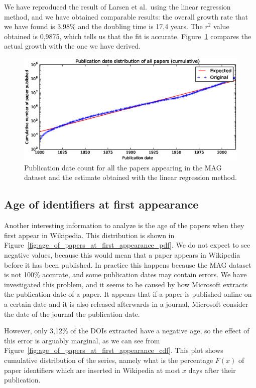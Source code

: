 We have reproduced the result of Larsen et al.\ using the linear regression method, and we have obtained comparable results: the overall growth rate that we have found is 3,98\% and the doubling time is 17,4 years.
The $r^2$ value obtained is 0,9875, which tells us that the fit is accurate.
Figure~\ref{fig:publication_date_regression} compares the actual growth with the one we have derived.

\begin{figure}[h]
\centering
\includegraphics[keepaspectratio=true, width=\textwidth]{assets/publication_date_regression}
\caption{Publication date count for all the papers appearing in the \ac{MAG} dataset and the estimate obtained with the linear regression method.}
\label{fig:publication_date_regression}
\end{figure}

\subsection{Age of identifiers at first appearance}
Another interesting information to analyze is the age of the papers when they first appear in Wikipedia.
This distribution is shown in Figure~\ref{fig:age_of_papers_at_first_appearance_pdf}.
We do not expect to see negative values, because this would mean that a paper appears in Wikipedia before it has been published.
In practice this happens because the \ac{MAG} dataset is not 100\% accurate, and some publication dates may contain errors.
We have investigated this problem, and it seems to be caused by how Microsoft extracts the publication date of a paper.
It appears that if a paper is published online on a certain date and it is also released afterwards in a journal, Microsoft consider the date of the journal the publication date.

However, only 3,12\% of the \acp{DOI} extracted have a negative age, so the effect of this error is arguably marginal, as we can see from Figure~\ref{fig:age_of_papers_at_first_appearance_cdf}.
This plot shows cumulative distribution of the series, namely what is the percentage $F(x)$ of paper identifiers which are inserted in Wikipedia at most $x$ days after their publication.

